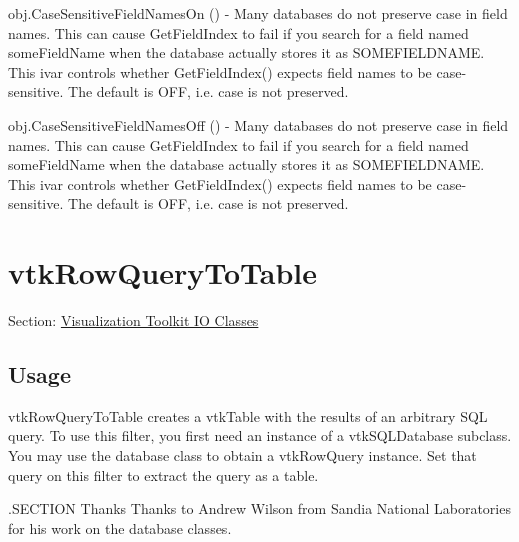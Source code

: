 \begin{DoxyItemize}
\item {\ttfamily obj.\-Case\-Sensitive\-Field\-Names\-On ()} -\/ Many databases do not preserve case in field names. This can cause Get\-Field\-Index to fail if you search for a field named some\-Field\-Name when the database actually stores it as S\-O\-M\-E\-F\-I\-E\-L\-D\-N\-A\-M\-E. This ivar controls whether Get\-Field\-Index() expects field names to be case-\/sensitive. The default is O\-F\-F, i.\-e. case is not preserved.  
\item {\ttfamily obj.\-Case\-Sensitive\-Field\-Names\-Off ()} -\/ Many databases do not preserve case in field names. This can cause Get\-Field\-Index to fail if you search for a field named some\-Field\-Name when the database actually stores it as S\-O\-M\-E\-F\-I\-E\-L\-D\-N\-A\-M\-E. This ivar controls whether Get\-Field\-Index() expects field names to be case-\/sensitive. The default is O\-F\-F, i.\-e. case is not preserved.  
\end{DoxyItemize}\hypertarget{vtkio_vtkrowquerytotable}{}\section{vtk\-Row\-Query\-To\-Table}\label{vtkio_vtkrowquerytotable}
Section\-: \hyperlink{sec_vtkio}{Visualization Toolkit I\-O Classes} \hypertarget{vtkwidgets_vtkxyplotwidget_Usage}{}\subsection{Usage}\label{vtkwidgets_vtkxyplotwidget_Usage}
vtk\-Row\-Query\-To\-Table creates a vtk\-Table with the results of an arbitrary S\-Q\-L query. To use this filter, you first need an instance of a vtk\-S\-Q\-L\-Database subclass. You may use the database class to obtain a vtk\-Row\-Query instance. Set that query on this filter to extract the query as a table.

.S\-E\-C\-T\-I\-O\-N Thanks Thanks to Andrew Wilson from Sandia National Laboratories for his work on the database classes.

